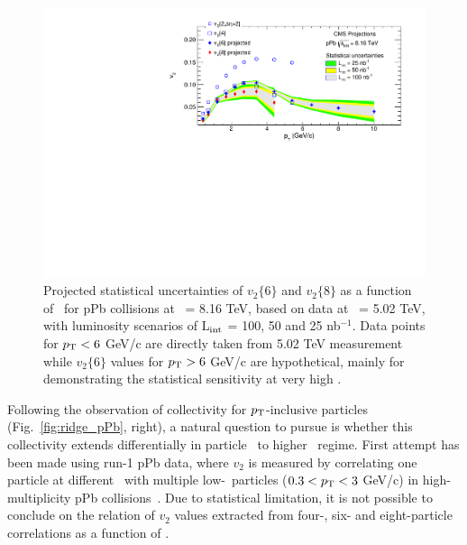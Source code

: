 \begin{figure}[t!]
  \begin{center}
    \includegraphics[width=\textwidth]{figures/vnpT_proj_100nb_combineLumi.pdf}
    \caption{ Projected statistical uncertainties of $v_2\{6\}$ and $v_2\{8\}$ as a function of \pt\ 
    for pPb collisions at \rootsNN\ = 8.16 TeV, based on data at \rootsNN\ = 5.02 TeV, with luminosity
    scenarios of L$_{\rm int}$ = 100, 50 and 25 nb$^{-1}$. Data points for $p_\mathrm{T}<6$ GeV/c
    are directly taken from 5.02 TeV measurement while $v_{2}\{6\}$ values for $p_\mathrm{T}>6$ GeV/c
    are hypothetical, mainly for demonstrating the statistical sensitivity at very high \pt.
    }
    \label{fig:vnpT}
  \end{center}
\end{figure}

Following the observation of collectivity for $p_\mathrm{T}$-inclusive 
particles~\cite{Khachatryan:2015waa} (Fig.~\ref{fig:ridge_pPb}, right), 
a natural question to pursue is whether this collectivity extends differentially 
in particle \pt\ to higher \pt\ regime. First attempt has been 
made using run-1 pPb data, where $v_2$ is measured 
by correlating one particle at different \pt\ with multiple low-\pt\ particles 
($0.3<p_\mathrm{T}<3$ GeV/c) in high-multiplicity pPb collisions~\cite{CMS-PAS-HIN-15-008}.
Due to statistical limitation, it is not possible to conclude on the relation of $v_{2}$
values extracted from four-, six- and eight-particle correlations as a function of \pt.

